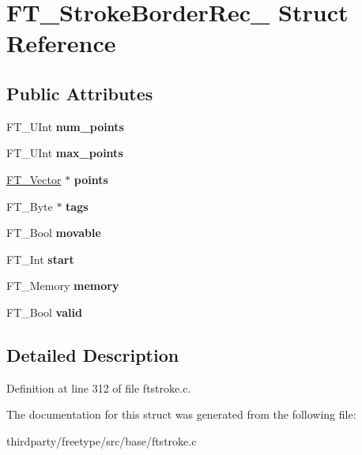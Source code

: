 \hypertarget{struct_f_t___stroke_border_rec__}{}\section{F\+T\+\_\+\+Stroke\+Border\+Rec\+\_\+ Struct Reference}
\label{struct_f_t___stroke_border_rec__}
\subsection*{Public Attributes}
\begin{DoxyCompactItemize}
\item 
\mbox{\label{struct_f_t___stroke_border_rec___a353a733f4c956225ed22dde9c1dd7650}} 
F\+T\+\_\+\+U\+Int {\bfseries num\+\_\+points}
\item 
\mbox{\label{struct_f_t___stroke_border_rec___ac54e15e3630fdc81a1094f504711d1ac}} 
F\+T\+\_\+\+U\+Int {\bfseries max\+\_\+points}
\item 
\mbox{\label{struct_f_t___stroke_border_rec___aff32e03c8c8ea7c27ed55acaead10c56}} 
\hyperlink{struct_f_t___vector__}{F\+T\+\_\+\+Vector} $\ast$ {\bfseries points}
\item 
\mbox{\label{struct_f_t___stroke_border_rec___a9ff778288026c62730b7cfd13e2c209e}} 
F\+T\+\_\+\+Byte $\ast$ {\bfseries tags}
\item 
\mbox{\label{struct_f_t___stroke_border_rec___a5dfee69b03dc25621f9ff4d48ad2f666}} 
F\+T\+\_\+\+Bool {\bfseries movable}
\item 
\mbox{\label{struct_f_t___stroke_border_rec___ab8e20ce116e574a92ef945bb6a7113d5}} 
F\+T\+\_\+\+Int {\bfseries start}
\item 
\mbox{\label{struct_f_t___stroke_border_rec___ac3694464157f84bef0c0ff40668b1bb6}} 
F\+T\+\_\+\+Memory {\bfseries memory}
\item 
\mbox{\label{struct_f_t___stroke_border_rec___a23fa7b9bd34745e0477b5d17e889b852}} 
F\+T\+\_\+\+Bool {\bfseries valid}
\end{DoxyCompactItemize}


\subsection{Detailed Description}


Definition at line 312 of file ftstroke.\+c.



The documentation for this struct was generated from the following file\+:\begin{DoxyCompactItemize}
\item 
thirdparty/freetype/src/base/ftstroke.\+c\end{DoxyCompactItemize}
